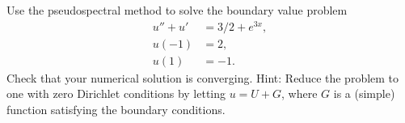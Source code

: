 \begin{problem}
	Use the pseudospectral method to solve the boundary value problem 
	\begin{align*}
	u'' + u' &= 3/2 + e^{3x}, \\
	u(-1) &= 2, \\
	u(1) &= -1.
	\end{align*}
	Check that your numerical solution is converging. Hint: Reduce the problem to one with zero Dirichlet conditions by letting $u = U+G$, where $G$ is a (simple) function satisfying the boundary conditions.
\end{problem}

% 
% 
% 
% 
% 
